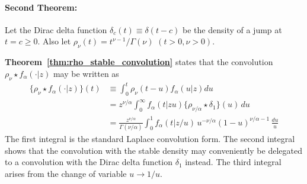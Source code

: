 \documentclass[a4paper,12pt]{article}
\begin{document}

\paragraph{Second  Theorem:}
 Let the Dirac   delta  function $\delta_c(t) \equiv\delta(t-c)$ be the   density of a jump at $t=c\ge0$.
Also let  $\rho_\nu(t) =  t^{\nu-1}/\Gamma(\nu)$ $(t>0, \nu>0)$. %

{\bf Theorem~\ref{thm:rho_stable_convolution}} states that  the  convolution $\rho_\nu \star f_\alpha(\cdot\vert z)$ may be written as 
\begin{align}
 \{\rho_\nu\star f_\alpha(\cdot\vert z) \}(t) 
 &\equiv \int_0^t \rho_\nu(t-u) f_\alpha(u\vert z) du \\
 &=  z^{\nu/\alpha}  \int_0^\infty  f_\alpha(t \vert z u)  \{\rho_{\nu/\alpha} \star \delta_1\}(u) \, du
\label{eq:intro_power_stable_conv} \\
&=  \frac{z^{\nu/\alpha}}{\Gamma(\nu/\alpha)}
  \int_0^1 f_\alpha(t\vert z/u) \, u^{-\nu/\alpha}  (1-u)^{\nu/\alpha-1}  \, \frac{du}{u} 
  \label{eq:intro_power_stable_conv_betadensity} 
\end{align}
The first integral is  the  standard Laplace convolution form.
The second integral
shows that the   convolution with the stable density may conveniently be delegated to a convolution with the 
Dirac delta function $\delta_1$ instead.
The third integral arises from the change of variable $u\to 1/u$.
\end{document}
